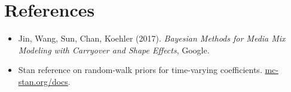 \documentclass[a4paper,11pt]{article}
\begin{document}
\section{References}

\begin{itemize}
\item Jin, Wang, Sun, Chan, Koehler (2017). \emph{Bayesian Methods for
Media Mix Modeling with Carryover and Shape Effects}, Google.
\item Stan reference on random-walk priors for time-varying coefficients.
\href{https://mc-stan.org/docs/}{mc-stan.org/docs}.
\end{itemize}
\end{document}
